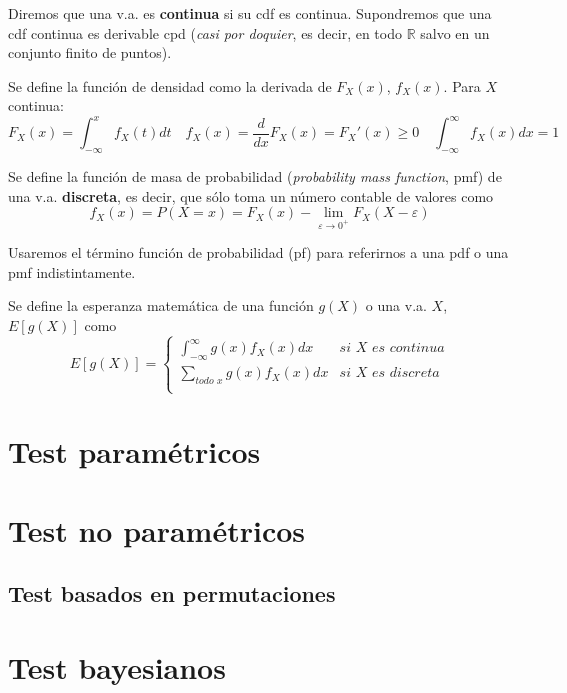 	Diremos que una v.a. es \textbf{continua} si su cdf es continua. Supondremos que una cdf continua es derivable cpd (\textit{casi por doquier}, es decir, en todo $\mathbb{R}$ salvo en un conjunto finito de puntos).
	
\begin{definicion}
	Se define la función de densidad como la derivada de $F_X(x)$, $f_X(x)$. Para $X$ continua:
	\[ F_X(x) = \int_{-\infty}^x f_X(t) dt \quad
		f_X(x) = \frac{d}{dx}F_X(x) = F_X'(x) \geq 0 \quad
		\int_{-\infty}^{\infty} f_X(x) dx = 1 \]
\end{definicion}
	
\begin{definicion}
	Se define la función de masa de probabilidad  (\textit{probability mass function}, pmf) de una v.a. \textbf{discreta}, es decir, que sólo toma un número contable de valores como
	\[ 
	f_X(x) = P(X=x) = 
		F_X(x) - 
		\lim_{\varepsilon \rightarrow 0^+} F_X(X-\varepsilon)
	\]
\end{definicion}

	Usaremos el término función de probabilidad (pf) para referirnos a una pdf o una pmf indistintamente.
	
\begin{definicion}
	Se define la esperanza matemática de una función $g(X)$ o una v.a. $X$, $E[g(X)]$ como
	\[ E[g(X)] = \left\lbrace 
		\begin{array}{cc}
		\int_{-\infty}^{\infty} g(x)f_X(x) dx &
			\textit{si } X \textit{ es continua} \\
		\sum\limits_{\textit{todo } x} g(x)f_X(x) dx &
			\textit{si } X \textit{ es discreta} \\			
		\end{array}\right.
	\]
\end{definicion}


	
\section{Test paramétricos}

\section{Test no paramétricos}

	\subsection{Test basados en permutaciones}

\section{Test bayesianos}	
%